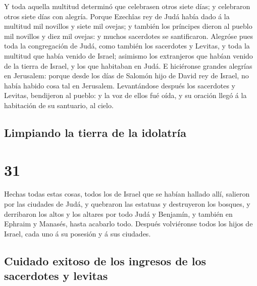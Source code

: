  Y toda aquella multitud determinó que celebrasen otros
siete días; y celebraron otros siete días con alegría. 
Porque Ezechîas rey de Judá había dado á la multitud mil novillos y
siete mil ovejas; y también los príncipes dieron al pueblo mil novillos
y diez mil ovejas: y muchos sacerdotes se santificaron. 
Alegróse pues toda la congregación de Judá, como también los sacerdotes
y Levitas, y toda la multitud que había venido de Israel; asimismo los
extranjeros que habían venido de la tierra de Israel, y los que
habitaban en Judá.  E hiciéronse grandes alegrías en
Jerusalem: porque desde los días de Salomón hijo de David rey de Israel,
no había habido cosa tal en Jerusalem.  Levantándose
después los sacerdotes y Levitas, bendijeron al pueblo: y la voz de
ellos fué oída, y su oración llegó á la habitación de su santuario, al
cielo.

\hypertarget{limpiando-la-tierra-de-la-idolatruxeda}{%
\subsection{Limpiando la tierra de la
idolatría}\label{limpiando-la-tierra-de-la-idolatruxeda}}

\hypertarget{section-14-31}{%
\section{31}\label{section-14-31}}

 Hechas todas estas cosas, todos los de Israel que se
habían hallado allí, salieron por las ciudades de Judá, y quebraron las
estatuas y destruyeron los bosques, y derribaron los altos y los altares
por todo Judá y Benjamín, y también en Ephraim y Manasés, hasta acabarlo
todo. Después volviéronse todos los hijos de Israel, cada uno á su
posesión y á sus ciudades.

\hypertarget{cuidado-exitoso-de-los-ingresos-de-los-sacerdotes-y-levitas}{%
\subsection{Cuidado exitoso de los ingresos de los sacerdotes y
levitas}\label{cuidado-exitoso-de-los-ingresos-de-los-sacerdotes-y-levitas}}

